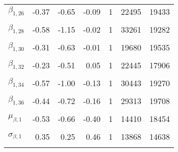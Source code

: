 \begin{table}
\begin{tabular}[t]{lrrrrrr}
$\beta_{1, 26}$ & -0.37 & -0.65 & -0.09 & 1 & 22495 & 19433\\
\cellcolor{gray!6}{$\beta_{1, 27}$} & \cellcolor{gray!6}{-0.75} & \cellcolor{gray!6}{-1.07} & \cellcolor{gray!6}{-0.43} & \cellcolor{gray!6}{1} & \cellcolor{gray!6}{24383} & \cellcolor{gray!6}{19407}\\
$\beta_{1, 28}$ & -0.58 & -1.15 & -0.02 & 1 & 33261 & 19282\\
\cellcolor{gray!6}{$\beta_{1, 29}$} & \cellcolor{gray!6}{-0.57} & \cellcolor{gray!6}{-0.80} & \cellcolor{gray!6}{-0.33} & \cellcolor{gray!6}{1} & \cellcolor{gray!6}{21516} & \cellcolor{gray!6}{17923}\\
$\beta_{1, 30}$ & -0.31 & -0.63 & -0.01 & 1 & 19680 & 19535\\
\cellcolor{gray!6}{$\beta_{1, 31}$} & \cellcolor{gray!6}{-0.86} & \cellcolor{gray!6}{-1.20} & \cellcolor{gray!6}{-0.51} & \cellcolor{gray!6}{1} & \cellcolor{gray!6}{20872} & \cellcolor{gray!6}{17547}\\
$\beta_{1, 32}$ & -0.23 & -0.51 & 0.05 & 1 & 22445 & 17906\\
\cellcolor{gray!6}{$\beta_{1, 33}$} & \cellcolor{gray!6}{-0.08} & \cellcolor{gray!6}{-0.44} & \cellcolor{gray!6}{0.29} & \cellcolor{gray!6}{1} & \cellcolor{gray!6}{12460} & \cellcolor{gray!6}{15855}\\
$\beta_{1, 34}$ & -0.57 & -1.00 & -0.13 & 1 & 30443 & 19270\\
\cellcolor{gray!6}{$\beta_{1, 35}$} & \cellcolor{gray!6}{-0.19} & \cellcolor{gray!6}{-0.50} & \cellcolor{gray!6}{0.11} & \cellcolor{gray!6}{1} & \cellcolor{gray!6}{19888} & \cellcolor{gray!6}{17643}\\
$\beta_{1, 36}$ & -0.44 & -0.72 & -0.16 & 1 & 29313 & 19708\\
\cellcolor{gray!6}{$\mu_{\beta, 0}$} & \cellcolor{gray!6}{0.89} & \cellcolor{gray!6}{0.84} & \cellcolor{gray!6}{0.95} & \cellcolor{gray!6}{1} & \cellcolor{gray!6}{10765} & \cellcolor{gray!6}{16101}\\
$\mu_{\beta, 1}$ & -0.53 & -0.66 & -0.40 & 1 & 14410 & 18454\\
\cellcolor{gray!6}{$\sigma_{\beta, 0}$} & \cellcolor{gray!6}{0.13} & \cellcolor{gray!6}{0.07} & \cellcolor{gray!6}{0.19} & \cellcolor{gray!6}{1} & \cellcolor{gray!6}{4777} & \cellcolor{gray!6}{5979}\\
$\sigma_{\beta, 1}$ & 0.35 & 0.25 & 0.46 & 1 & 13868 & 14638\\
\cellcolor{gray!6}{$\sigma_{y}$} & \cellcolor{gray!6}{0.16} & \cellcolor{gray!6}{0.14} & \cellcolor{gray!6}{0.18} & \cellcolor{gray!6}{1} & \cellcolor{gray!6}{15022} & \cellcolor{gray!6}{19497}\\
\bottomrule
\end{tabular}
\end{table}